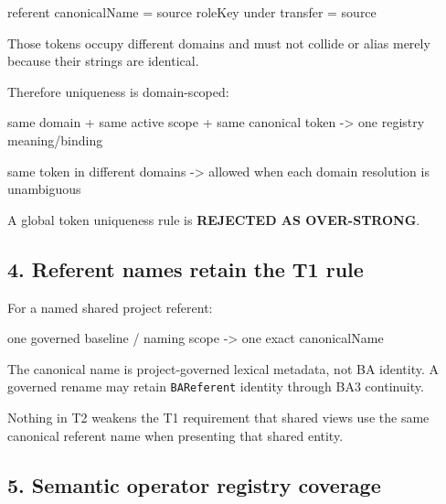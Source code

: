 \documentclass[
  10pt,
  a4paper,
]{article}
\newenvironment{Shaded}{}{}
\newcommand{\NormalTok}[1]{#1}
\begin{document}
\begin{Shaded}
\begin{Highlighting}[]
\NormalTok{referent canonicalName = source}
\NormalTok{roleKey under transfer = source}
\end{Highlighting}
\end{Shaded}

Those tokens occupy different domains and must not collide or alias
merely because their strings are identical.

Therefore uniqueness is domain-scoped:

\begin{Shaded}
\begin{Highlighting}[]
\NormalTok{same domain + same active scope + same canonical token}
\NormalTok{    {-}\textgreater{} one registry meaning/binding}

\NormalTok{same token in different domains}
\NormalTok{    {-}\textgreater{} allowed when each domain resolution is unambiguous}
\end{Highlighting}
\end{Shaded}

A global token uniqueness rule is \textbf{REJECTED AS OVER-STRONG}.

\subsection{4. Referent names retain the T1
rule}\label{referent-names-retain-the-t1-rule}

For a named shared project referent:

\begin{Shaded}
\begin{Highlighting}[]
\NormalTok{one governed baseline / naming scope}
\NormalTok{    {-}\textgreater{} one exact canonicalName}
\end{Highlighting}
\end{Shaded}

The canonical name is project-governed lexical metadata, not BA
identity. A governed rename may retain \texttt{BAReferent} identity
through BA3 continuity.

Nothing in T2 weakens the T1 requirement that shared views use the same
canonical referent name when presenting that shared entity.

\subsection{5. Semantic operator registry
coverage}\label{semantic-operator-registry-coverage}
\end{document}
